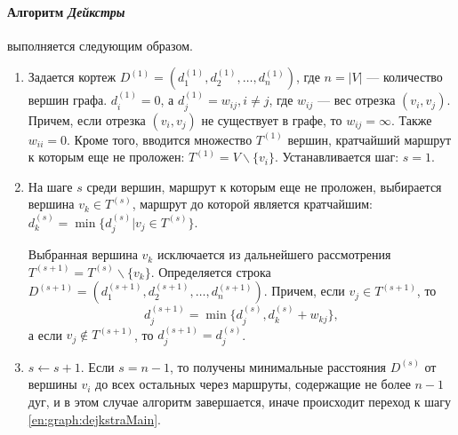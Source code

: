 \paragraph{Алгоритм \emph{Дейкстры}} выполняется следующим образом.
\begin{enumerate}
    \item Задается кортеж $D^{(1)}=(d_1^{(1)},d_2^{(1)},\ldots,d_n^{(1)})$, где $n=|V|$ --- количество вершин графа. $d_i^{(1)}=0$, а $d_j^{(1)}=w_{ij}, i\neq j$, где $w_{ij}$ --- вес отрезка $(v_i,v_j)$. Причем, если отрезка $(v_i,v_j)$ не существует в графе, то $w_{ij}=\infty$. Также $w_{ii}=0$. Кроме того, вводится множество $T^{(1)}$ вершин, кратчайший маршрут к которым еще не проложен: $T^{(1)}=V\backslash\{v_i\}$. Устанавливается шаг: $s=1$.
    
    \item\label{en:graph:dejkstraMain} На шаге $s$ среди вершин, маршрут к которым еще не проложен, выбирается вершина $v_k\in T^{(s)}$, маршрут до которой является кратчайшим: $d_k^{(s)}=\min\{d_j^{(s)}|v_j\in T^{(s)}\}$.
    
    Выбранная вершина $v_k$ исключается из дальнейшего рассмотрения $T^{(s+1)}=T^{(s)}\backslash\{v_k\}$.
    Определяется строка $D^{(s+1)}=(d_1^{(s+1)},d_2^{(s+1)},\ldots,d_n^{(s+1)})$. Причем, если $v_j\in T^{(s+1)}$, то 
    \[
        d_j^{(s+1)}=\min\{d_j^{(s)}, d_k^{(s)}+w_{kj}\},
    \]
    а если $v_j\not\in T^{(s+1)}$, то $d_j^{(s+1)}=d_j^{(s)}$.
    
    \item $s\gets s+1$. Если $s=n-1$, то получены минимальные расстояния $D^{(s)}$ от вершины $v_i$ до всех остальных через маршруты, содержащие не более $n-1$ дуг, и в этом случае алгоритм завершается, иначе происходит переход к шагу \ref{en:graph:dejkstraMain}.
\end{enumerate}


